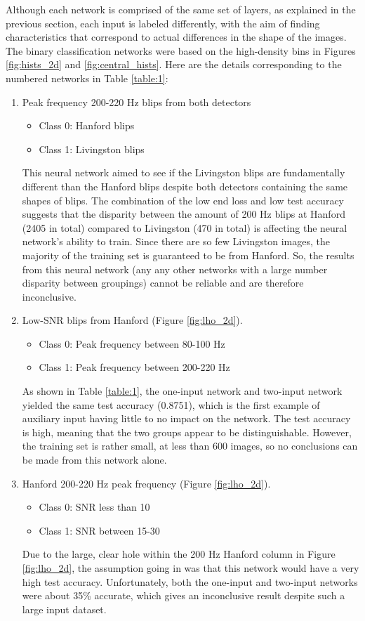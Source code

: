 \documentclass[a4paper]{article}
\begin{document}
Although each network is comprised of the same set of layers, as explained in the previous section, each input is labeled differently, with the aim of finding characteristics that correspond to actual differences in the shape of the images. The binary classification networks were based on the high-density bins in Figures \ref{fig:hists_2d} and \ref{fig:central_hists}. Here are the details corresponding to the numbered networks in Table \ref{table:1}:
\begin{enumerate}

	\item Peak frequency 200-220 Hz blips from both detectors
	\begin{itemize}
		\item Class 0: Hanford blips
		\item Class 1: Livingston blips
	\end{itemize} This neural network aimed to see if the Livingston blips are fundamentally different than the Hanford blips despite both detectors containing the same shapes of blips. The combination of the low end loss and low test accuracy suggests that the disparity between the amount of 200 Hz blips at Hanford (2405 in total) compared to Livingston (470 in total) is affecting the neural network's ability to train. Since there are so few Livingston images, the majority of the training set is guaranteed to be from Hanford. So, the results from this neural network (any any other networks with a large number disparity between groupings) cannot be reliable and are therefore inconclusive.

	\item Low-SNR blips from Hanford (Figure \ref{fig:lho_2d}). 	
	\begin{itemize}
		\item Class 0: Peak frequency between 80-100 Hz
		\item Class 1: Peak frequency between 200-220 Hz
	\end{itemize} As shown in Table \ref{table:1}, the one-input network and two-input network yielded the same test accuracy (0.8751), which is the first example of auxiliary input having little to no impact on the network. The test accuracy is high, meaning that the two groups appear to be distinguishable. However, the training set is rather small, at less than 600 images, so no conclusions can be made from this network alone.

	\item Hanford 200-220 Hz peak frequency (Figure \ref{fig:lho_2d}). 
	\begin{itemize}
		\item Class 0: SNR less than 10
		\item Class 1: SNR between 15-30
	\end{itemize} Due to the large, clear hole within the 200 Hz Hanford column in Figure \ref{fig:lho_2d}, the assumption going in was that this network would have a very high test accuracy. Unfortunately, both the one-input and two-input networks were about 35\% accurate, which gives an inconclusive result despite such a large input dataset.
	

\end{enumerate}
\end{document}
